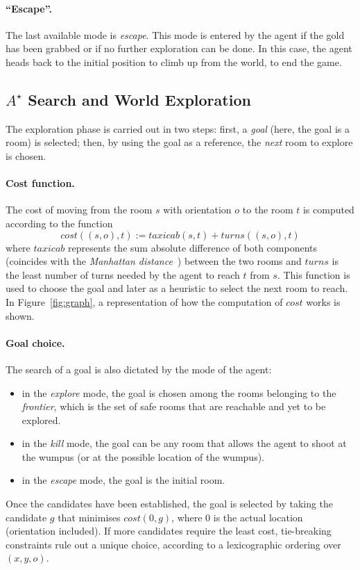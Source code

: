 \documentclass{llncs}
\begin{document}
\paragraph{\enquote{Escape}.} The last available mode is \emph{escape}.
This mode is entered by the agent if the gold has been grabbed or if no further exploration can be done.
In this case, the agent heads back to the initial position to climb up from the world, to end the game.

\subsection{$A^{\star}$ Search and World Exploration}

The exploration phase is carried out in two steps: first, a \emph{goal} (here, the goal is a room) is selected; then, by using the goal as a reference, the \emph{next} room to explore is chosen.

\paragraph{Cost function.} The cost of moving from the room $s$ with orientation $o$ to the room $t$ is computed according to the function
\begin{equation}
	cost((s,o),t) := taxicab(s,t) + turns((s,o),t)
\end{equation}
where $taxicab$ represents the sum absolute difference of both components (coincides with the \emph{Manhattan distance}~\cite{Manhattan}) between the two rooms and $turns$ is the least number of turns needed by the agent to reach $t$ from $s$.
This function is used to choose the goal and later as a heuristic to select the next room to reach.
In Figure~\ref{fig:graph}, a representation of how the computation of $cost$ works is shown.

\paragraph{Goal choice.} The search of a goal is also dictated by the mode of the agent:
\begin{itemize}
	\item in the \emph{explore} mode, the goal is chosen among the rooms belonging to the \emph{frontier}, which is the set of safe rooms that are reachable and yet to be explored.
	\item in the \emph{kill} mode, the goal can be any room that allows the agent to shoot at the wumpus (or at the possible location of the wumpus).
	\item in the \emph{escape} mode, the goal is the initial room.
\end{itemize}
Once the candidates have been established, the goal is selected by taking the candidate $g$ that minimises $cost(0,g)$, where $0$ is the actual location (orientation included).
If more candidates require the least cost, tie-breaking constraints rule out a unique choice, according to a lexicographic ordering over $(x,y,o)$.
\end{document}
